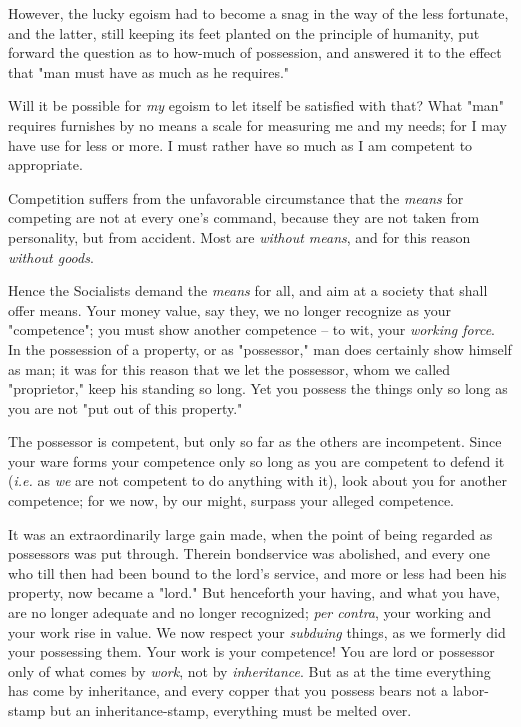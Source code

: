 However, the lucky egoism had to become a snag in the way of the less 
fortunate, and the latter, still keeping its feet planted on the principle of 
humanity, put forward the question as to how-much of possession, and answered 
it to the effect that "{}man must have as much as he requires."{}

Will it be possible for \textit{my} egoism to let itself be satisfied with 
that? What "{}man"{} requires furnishes by no means a scale for measuring me 
and my needs; for I may have use for less or more. I must rather have so much 
as I am competent to appropriate.

Competition suffers from the unfavorable circumstance that the \textit{means} 
for competing are not at every one's command, because they are not taken from 
personality, but from accident. Most are \textit{without means}, and for this 
reason \textit{without goods}.

Hence the Socialists demand the \textit{means} for all, and aim at a society 
that shall offer means. Your money value, say they, we no longer recognize as 
your "{}competence"{}; you must show another competence -- to wit, your 
\textit{working force}. In the possession of a property, or as 
"{}possessor,"{} man does certainly show himself as man; it was for this 
reason that we let the possessor, whom we called "{}proprietor,"{} keep his 
standing so long. Yet you possess the things only so long as you are not 
"{}put out of this property."{}

The possessor is competent, but only so far as the others are incompetent. 
Since your ware forms your competence only so long as you are competent to 
defend it (\textit{i.e.} as \textit{we} are not competent to do anything with 
it), look about you for another competence; for we now, by our might, surpass 
your alleged competence.

It was an extraordinarily large gain made, when the point of being regarded as 
possessors was put through. Therein bondservice was abolished, and every one 
who till then had been bound to the lord's service, and more or less had been 
his property, now became a "{}lord."{} But henceforth your having, and what 
you have, are no longer adequate and no longer recognized; \textit{per 
contra}, your working and your work rise in value. We now respect your 
\textit{subduing} things, as we formerly did your possessing them. Your work 
is your competence! You are lord or possessor only of what comes by 
\textit{work}, not by \textit{inheritance}. But as at the time everything has 
come by inheritance, and every copper that you possess bears not a labor-stamp 
but an inheritance-stamp, everything must be melted over.

